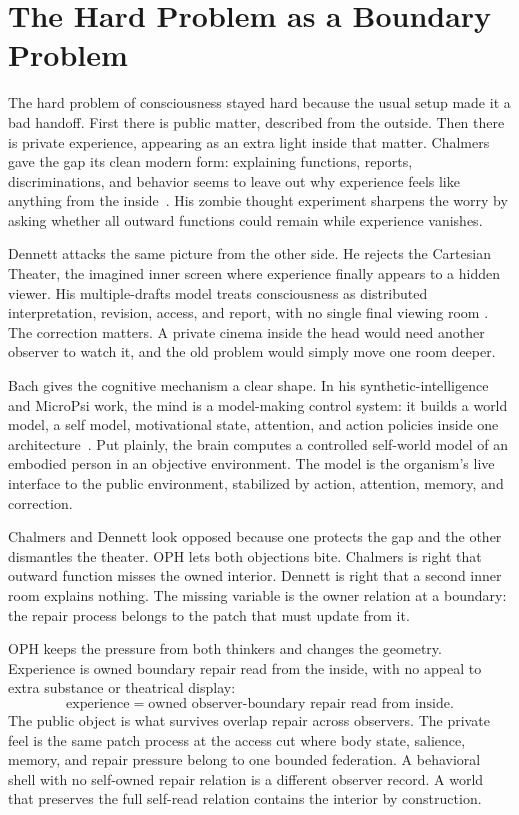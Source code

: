 \documentclass[11pt]{article}
\theoremstyle{remark}
\theoremstyle{plain}
\begin{document}
\section{The Hard Problem as a Boundary Problem}

The hard problem of consciousness stayed hard because the usual setup made it
a bad handoff. First there is public matter, described from the outside. Then
there is private experience, appearing as an extra light inside that matter.
Chalmers gave the gap its clean modern form: explaining functions, reports,
discriminations, and behavior seems to leave out why experience feels like
anything from the inside~\cite{Chalmers1995}. His zombie thought experiment
sharpens the worry by asking whether all outward functions could remain while
experience vanishes.

Dennett attacks the same picture from the other side. He rejects the Cartesian
Theater, the imagined inner screen where experience finally appears to a hidden
viewer. His multiple-drafts model treats consciousness as distributed
interpretation, revision, access, and report, with no single final viewing room
\cite{Dennett1991}. The correction matters. A private cinema inside the
head would need another observer to watch it, and the old problem would simply
move one room deeper.

Bach gives the cognitive mechanism a clear shape. In his synthetic-intelligence
and MicroPsi work, the mind is a model-making control system: it builds a world
model, a self model, motivational state, attention, and action policies inside
one architecture~\cite{Bach2009,BachMicroPsi2006}. Put plainly, the brain
computes a controlled self-world model of an embodied person in an
objective environment. The model is the organism's live interface to the
public environment,
stabilized by action, attention, memory, and correction.

Chalmers and Dennett look opposed because one protects the gap and the other
dismantles the theater. OPH lets both objections bite. Chalmers is right that
outward function misses the owned interior. Dennett is right that a second
inner room explains nothing. The missing variable is the owner relation at a
boundary: the repair process belongs to the patch that must update from it.

OPH keeps the pressure from both thinkers and changes the geometry. Experience
is owned boundary repair read from the inside, with no appeal to extra substance
or theatrical display:
\[
\boxed{
\text{experience}=\text{owned observer-boundary repair read from inside}.
}
\]
The public object is what survives overlap repair across observers. The private
feel is the same patch process at the access cut where body state, salience,
memory, and repair pressure belong to one bounded federation. A behavioral shell
with no self-owned repair relation is a different observer record. A world that
preserves the full self-read relation contains the interior by construction.
\end{document}
